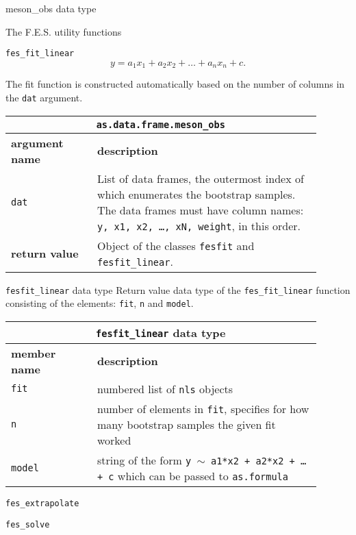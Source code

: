 \documentclass[10pt,a4paper]{article}
\begin{document}
\begin{section}{{\ttfamily meson\_obs} data type}
\begin{section}{The F.E.S. utility functions}
\begin{subsection}{ {\tt fes\_fit\_linear} }
\begin{equation}
y=a_1 x_1 + a_2 x_2 + \ldots + a_n x_n + c.
\end{equation}

The fit function is constructed automatically based on the number of columns in the {\tt dat} argument.

\begin{table}[h]
\begin{tabular}{|p{0.25\linewidth}|p{0.65\linewidth}|}
\hline
\multicolumn{2}{|c|}{ {\tt as.data.frame.meson\_obs} } \\
\hline \hline \textbf{argument name} & \textbf{description} \\ \hline
{\tt dat} & List of data frames, the outermost index of which enumerates the bootstrap samples.
The data frames must have column names: {\tt y, x1, x2, \ldots, xN, weight}, in this order. \\
\hline 
\textbf{return value} & Object of the classes {\tt fesfit} and {\tt fesfit\_linear}. \\
\hline
\end{tabular}
\end{table}

\end{subsection}

\begin{subsection}{ {\tt fesfit\_linear} data type }
Return value data type of the {\tt fes\_fit\_linear} function consisting of the elements: {\tt fit}, {\tt n} and {\tt model}.

\begin{table}[h]
\begin{tabular}{|p{0.25\linewidth}|p{0.65\linewidth}|}
\hline
\multicolumn{2}{|c|}{ {\tt fesfit\_linear} data type } \\
\hline \hline \textbf{member name} & \textbf{description} \\ \hline
{\tt fit} & numbered list of {\tt nls} objects \\ 
{\tt n}  & number of elements in {\tt fit}, specifies for how many bootstrap samples the given fit worked \\ 
{\tt model} & string of the form {\tt y $\sim$ a1*x2 + a2*x2 + \ldots + c} which can be passed to {\tt as.formula} \\
\hline 
\end{tabular}
\end{table}


\end{subsection}

\begin{subsection}{ {\tt fes\_extrapolate} }
\end{subsection}

\begin{subsection}{ {\tt fes\_solve} }
\end{subsection}

\end{section} 


\end{section}
\end{document}
